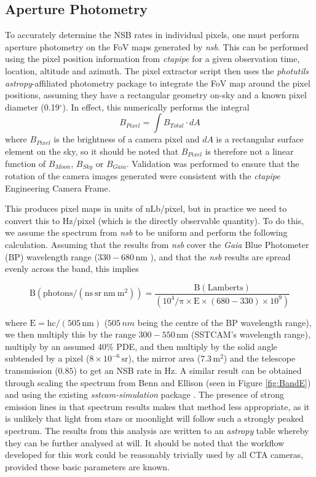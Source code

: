 \subsection{Aperture Photometry}
\label{sec:pixelextract}
To accurately determine the NSB rates in individual pixels, one must perform aperture photometry on the FoV maps generated by \textit{nsb}. This can be performed using the pixel position information from \textit{ctapipe} \cite{ctapipe2} for a given observation time, location, altitude and azimuth. The pixel extractor script then uses the \textit{photutils} \textit{astropy}-affiliated \cite{astropy:2018} photometry package \cite{photutils} to integrate the FoV map around the pixel positions, assuming they have a rectangular geometry on-sky and a known pixel diameter (0.19$^{\circ}$). In effect, this numerically performs the integral
\begin{equation}
    B_{Pixel}=\int B_{Total} \cdot dA
\end{equation}
where $B_{Pixel}$ is the brightness of a camera pixel and $dA$ is a rectangular surface element on the sky, so it should be noted that $B_{Pixel}$ is therefore not a linear function of $B_{Moon}$, $B_{Sky}$ or $B_{Gaia}$. Validation was performed to ensure that the rotation of the camera images generated were consistent with the \textit{ctapipe} Engineering Camera Frame.

This produces pixel maps in units of nLb/pixel, but in practice we need to convert this to Hz/pixel (which is the directly observable quantity). To do this, we assume the spectrum from \textit{nsb} to be uniform and perform the following calculation. Assuming that the results from \textit{nsb} cover the \textit{Gaia} Blue Photometer (BP) wavelength range ($\mathrm{330-680\,nm}$ \cite{gaiadr1b}), and that the \textit{nsb} results are spread evenly across the band, this implies

\begin{equation}
    \mathrm{B (photons/(ns\ sr\ nm\ m^2) )=\frac{B (Lamberts)}{(10^4 / \pi \times E \times (680-330) \times 10^9)}}
\end{equation}

where $\mathrm{E=hc/(505\,nm)}$ ($505\,nm$ being the centre of the BP wavelength range), we then multiply this by the range $\mathrm{300-550\,nm}$ (SSTCAM's wavelength range), multiply by an assumed 40\% PDE, and then multiply by the solid angle subtended by a pixel ($\mathrm{8 \times 10^{-6}\,sr}$), the mirror area ($\mathrm{7.3\,m^2}$) and the telescope transmission ($0.85$) to get an NSB rate in Hz. A similar result can be obtained through scaling the spectrum from Benn and Ellison \cite{BandE} (seen in Figure \ref{fig:BandE}) and using the existing \textit{sstcam-simulation} package \cite{sstcamsimulation}. The presence of strong emission lines in that spectrum results makes that method less appropriate, as it is unlikely that light from stars or moonlight will follow such a strongly peaked spectrum. The results from this analysis are written to an \textit{astropy} table whereby they can be further analysed at will. It should be noted that the workflow developed for this work could be reasonably trivially used by all CTA cameras, provided these basic parameters are known.

